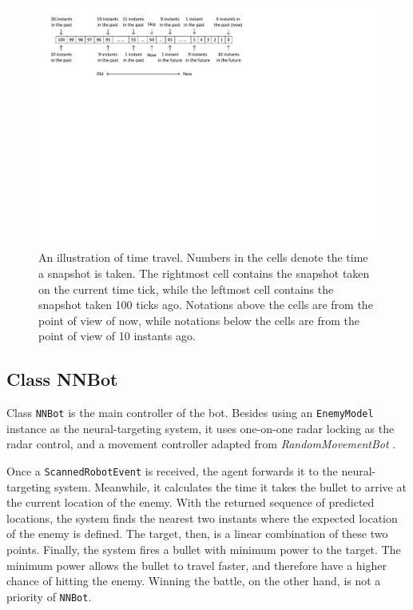 \documentclass[11pt,a4paper]{article}
\begin{document}
\begin{figure}[h]
	\centering
	\includegraphics[scale=0.85]{time.pdf}
	\caption{An illustration of time travel. Numbers in the cells denote the time a snapshot is taken. The rightmost cell contains the snapshot taken on the current time tick, while the leftmost cell contains the snapshot taken 100 ticks ago. Notations above the cells are from the point of view of now, while notations below the cells are from the point of view of 10 instants ago.}
	\label{fig:time}
\end{figure}

\subsection{Class NNBot}

Class \texttt{NNBot} is the main controller of the bot. Besides using an \texttt{EnemyModel} instance as the neural-targeting system, it uses one-on-one radar locking as the radar control, and a movement controller adapted from \emph{RandomMovementBot} \cite{random_movement_bot}.

Once a \texttt{ScannedRobotEvent} is received, the agent forwards it to the neural-targeting system. Meanwhile, it calculates the time it takes the bullet to arrive at the current location of the enemy. With the returned sequence of predicted locations, the system finds the nearest two instants where the expected location of the enemy is defined. The target, then, is a linear combination of these two points. Finally, the system fires a bullet with minimum power to the target. The minimum power allows the bullet to travel faster, and therefore have a higher chance of hitting the enemy. Winning the battle, on the other hand, is not a priority of \texttt{NNBot}.
\end{document}
